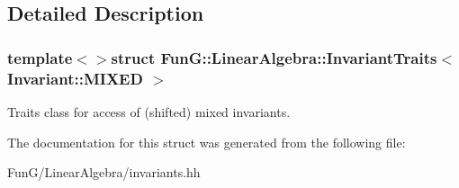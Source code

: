 \subsection{Detailed Description}
\subsubsection*{template$<$$>$struct Fun\-G\-::\-Linear\-Algebra\-::\-Invariant\-Traits$<$ Invariant\-::\-M\-I\-X\-E\-D $>$}

Traits class for access of (shifted) mixed invariants. 

The documentation for this struct was generated from the following file\-:\begin{DoxyCompactItemize}
\item 
Fun\-G/\-Linear\-Algebra/invariants.\-hh\end{DoxyCompactItemize}
